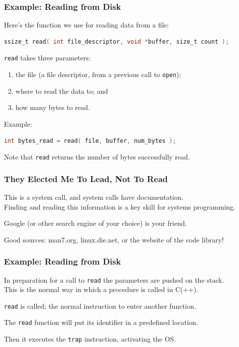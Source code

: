 \begin{frame}[fragile]
	\frametitle{Example: Reading from Disk}
	
Here's the function we use for reading data from a file:
	
		\begin{lstlisting}[language=C]
ssize_t read( int file_descriptor, void *buffer, size_t count );
		\end{lstlisting}


	\texttt{read} takes three parameters:
	\begin{enumerate}
		\item the file (a file descriptor, from a previous call
		      to \texttt{open});
		\item where to read the data to; and
		\item how many bytes to read.
	\end{enumerate}
	
	Example:

		\begin{lstlisting}[language=C]
int bytes_read = read( file, buffer, num_bytes );
		\end{lstlisting}


	Note that \texttt{read} returns the number of bytes successfully read.

\end{frame}


\begin{frame}
\frametitle{They Elected Me To Lead, Not To Read}

This is a system call, and system calls have documentation.\\
\quad Finding and reading this information is a key skill for systems programming.

Google (or other search engine of your choice) is your friend.

Good sources: man7.org, linux.die.net, or the website of the code library!

\end{frame}


\begin{frame}
	\frametitle{Example: Reading from Disk}

	In preparation for a call to \texttt{read} the parameters are pushed on the stack.\\
	\quad This is the normal way in which a procedure is called in C(++).

	\texttt{read} is called; the normal instruction to enter another function.

	The \texttt{read} function will put its identifier in a predefined location.

	Then it executes the \texttt{trap} instruction, activating the OS.

\end{frame}

